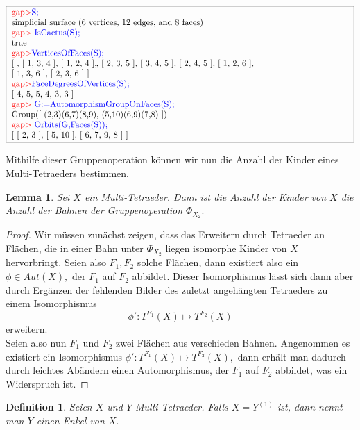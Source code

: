 \documentclass[12pt,titlepage,twoside,cleardoublepage]{article}
\theoremstyle{nummermitklammern}
\newtheorem{lemma}[temp]{Lemma}
\newtheorem{definition}[temp]{Definition}
\newtheorem{definition}[zahl]{Definition}
\newtheorem{lemma}[zahl]{Lemma}
\numberwithin{equation}{section}
\begin{document}
\begin{center}
$\fbox{
\parbox{14cm} {
\textcolor{red}{gap$>$}\textcolor{blue}{ S;}\newline
simplicial surface (6 vertices, 12 edges, and 8 faces)\newline
\textcolor{red}{gap$>$} \textcolor{blue}{ IsCactus(S);}\newline
true\newline
\textcolor{red}{gap$>$}\textcolor{blue}{  VerticesOfFaces(S);}\newline
[ , [ 1, 3, 4 ], [ 1, 2, 4 ],, [ 2, 3, 5 ], [ 3, 4, 5 ], [ 2, 4, 5 ],
  [ 1, 2, 6 ],\newline
   [ 1, 3, 6 ], [ 2, 3, 6 ] ]\newline
\textcolor{red}{gap$>$}\textcolor{blue}{  FaceDegreesOfVertices(S);}\newline
[ 4, 5, 5, 4, 3, 3 ]\newline
\textcolor{red}{gap$>$} \textcolor{blue}{ G:=AutomorphismGroupOnFaces(S);}\newline
Group([ (2,3)(6,7)(8,9), (5,10)(6,9)(7,8) ])\newline
\textcolor{red}{gap$>$} \textcolor{blue}{ Orbits(G,Faces(S));}\newline
[ [ 2, 3 ], [ 5, 10 ], [ 6, 7, 9, 8 ] ]
}}$
\end{center}
Mithilfe dieser Gruppenoperation können wir nun die Anzahl der Kinder eines Multi-Tetraeders bestimmen.
\begin{lemma}
Sei $X$ ein Multi-Tetraeder. Dann ist die Anzahl der Kinder von $X$ die Anzahl der Bahnen der Gruppenoperation $\Phi_{X_2}.$
\end{lemma}
\begin{proof}
Wir müssen zunächst zeigen, dass das Erweitern durch Tetraeder an Flächen, die in einer Bahn unter $\Phi_{X_2}$ liegen isomorphe Kinder von $X$ hervorbringt. Seien also $F_1,F_2$ solche Flächen, dann existiert also ein $\phi \in Aut(X),$ der $F_1$ auf $F_2$ abbildet. Dieser Isomorphismus lässt sich dann aber durch Ergänzen der fehlenden Bilder des zuletzt angehängten Tetraeders zu einem Isomorphismus 
\[
\phi':T^{F_1}(X)\mapsto T^{F_2}(X)
\]
 erweitern. \\
 Seien also nun $F_1$ und $F_2$ zwei Flächen aus verschieden Bahnen. Angenommen es existiert ein Isomorphismus $\phi':T^{F_1}(X)\mapsto T^{F_2}(X),$ dann erhält man dadurch durch leichtes Abändern einen Automorphismus, der $F_1$ auf $F_2$ abbildet, was ein Widerspruch ist. 
\end{proof}
\begin{definition}
Seien $X$ und $Y$ Multi-Tetraeder. Falls $X=Y^{(1)}$ ist, dann nennt man $Y$ einen \emph{Enkel}  von $X.$ 
\end{definition}
\end{document}
